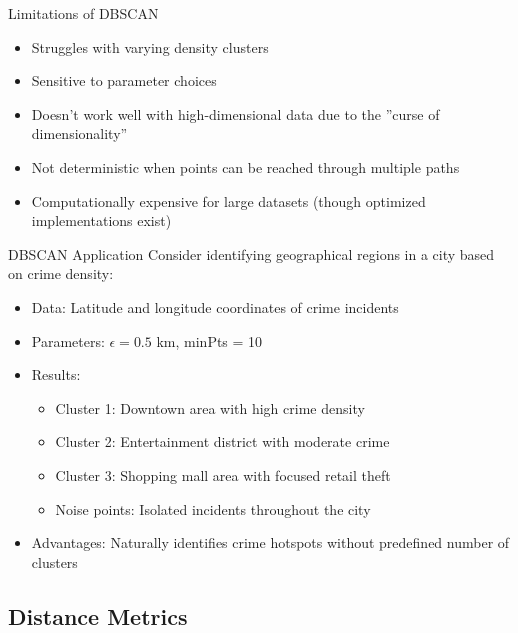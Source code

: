 \begin{concept}{Limitations of DBSCAN}
\begin{itemize}
    \item Struggles with varying density clusters
    \item Sensitive to parameter choices
    \item Doesn't work well with high-dimensional data due to the ''curse of dimensionality''
    \item Not deterministic when points can be reached through multiple paths
    \item Computationally expensive for large datasets (though optimized implementations exist)
\end{itemize}
\end{concept}

\multend

\begin{example}{DBSCAN Application}
Consider identifying geographical regions in a city based on crime density:
\begin{itemize}
    \item Data: Latitude and longitude coordinates of crime incidents
    \item Parameters: $\epsilon = 0.5$ km, minPts = 10
    \item Results:
    \begin{itemize}
        \item Cluster 1: Downtown area with high crime density
        \item Cluster 2: Entertainment district with moderate crime
        \item Cluster 3: Shopping mall area with focused retail theft
        \item Noise points: Isolated incidents throughout the city
    \end{itemize}
    \item Advantages: Naturally identifies crime hotspots without predefined number of clusters
\end{itemize}
\end{example}

\subsection{Distance Metrics}

